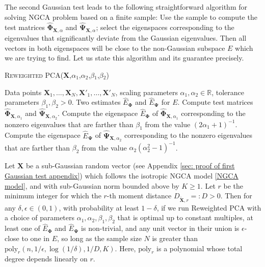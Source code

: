 \documentclass[final,12pt]{colt2018} %
\numberwithin{equation}{section}
\newcommand{\R}{\mathbb{R}}
\newcommand{\boldPhi}{\boldsymbol{\Phi}}
\newcommand{\boldPsi}{\boldsymbol{\Psi}}
\newcommand{\boldX}{\textbf{X}}
\begin{document}
The second Gaussian test leads to the following straightforward algorithm for solving NGCA problem
based on a finite sample:
Use the sample to compute the test matrices $\hat{\boldPhi}_{\boldX,\alpha}$ and $\hat{\boldPsi}_{\boldX,\alpha}$;
select the eigenspaces corresponding to the eigenvalues that significantly 
deviate from the Gaussian eigenvalues.
Then all vectors in both eigenspaces will be close to the non-Gaussian subspace $E$ which we are trying to find. Let us state this algorithm and its guarantee precisely. 

\begin{algorithm}[H]                      
\caption{\textsc {Reweighted PCA($\boldX$,$\alpha_1$,$\alpha_2$,$\beta_1$,$\beta_2$)}}     
\begin{algorithmic}[1]              
    \REQUIRE Data points $\boldX_1,\ldots,\boldX_N, \boldX'_1,\ldots,\boldX'_N$, 
    	scaling parameters $\alpha_1,\alpha_2 \in \R$, 
	tolerance parameters $\beta_1,\beta_2 > 0$.
    \ENSURE Two estimates $\hat{E}_{\boldPhi}$ and $\hat{E}_{\boldPsi}$ for $E$.
    \STATE Compute test matrices $\hat{\boldPhi}_{\boldX,\alpha_1}$ and $\hat{\boldPsi}_{\boldX,\alpha_2}$.
    \STATE Compute the eigenspace $\hat{E}_{\boldPhi}$ of $\hat{\boldPhi}_{\boldX,\alpha_1}$ 
    	corresponding to the nonzero eigenvalues that are farther than $\beta_1$ from the value $(2\alpha_1+1)^{-1}$.
    \STATE Compute the eigenspace $\hat{E}_{\boldPsi}$ of $\hat{\boldPsi}_{\boldX,\alpha_2}$ 
    	corresponding to the nonzero eigenvalues that are farther than $\beta_2$ from 
	the value $\alpha_2(\alpha_2^2-1)^{-1}$.
\end{algorithmic}
\end{algorithm}

\begin{theorem} \label{thm:finding_one_direction}
  Let $\boldX$ be a sub-Gaussian random vector (see Appendix \ref{sec: proof of first Gaussian test appendix}) which follows the isotropic NGCA model \eqref{NGCA model}, 
  and with sub-Gaussian norm bounded above by $K \geq 1$. 
  Let $r$ be the minimum integer for which the $r$-th moment distance $D_{\tilde{\boldX},r} =: D > 0$. Then for any $\delta,\epsilon \in (0,1)$, with probability at least $1-\delta$, if we run {\textsc Reweighted PCA} with a choice of parameters $\alpha_1,\alpha_2,\beta_1,\beta_2$ that is optimal up to constant multiples, at least one of $\hat{E}_{\boldPhi}$ and $\hat{E}_{\boldPsi}$ is non-trivial, and any unit vector in their union is $\epsilon$-close to one in $E$, so long as the sample size $N$ is greater than $\text{poly}_r(n,1/\epsilon,\log(1/\delta),1/D,K)$. Here, $\text{poly}_r$ is a polynomial whose total degree depends linearly on $r$. 
\end{theorem}
\end{document}
